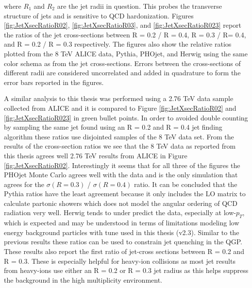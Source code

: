 \noindent
where $R_{1}$ and $R_{2}$ are the jet radii in question. This probes the transverse structure of jets and is sensitive to QCD hardonization\cite{SOYEZ201159}.  Figures \ref{fig:JetXsecRatioR02}, \ref{fig:JetXsecRatioR03}, and \ref{fig:JetXsecRatioR023} report the ratios of the jet cross-sections between R = 0.2 / R = 0.4, R = 0.3 / R= 0.4, and R = 0.2 / R = 0.3 respectively.  The figures also show the relative ratios plotted from the 8 TeV ALICE data, Pythia, PHOjet, and Herwig using the same color schema as from the jet cross-sections.  Errors between the cross-sections of different radii are considered uncorrelated and added in quadrature to form the error bars reported in the figures.

A similar analysis to this thesis was performed using a 2.76 TeV  data sample collected from ALICE\cite{MA2013319} and it is compared to Figure \ref{fig:JetXsecRatioR02} and \ref{fig:JetXsecRatioR023} in green bullet points.  In order to avoided double counting by sampling the same jet  found using an R = 0.2 and R = 0.4 jet finding algorithm these ratios use disjointed samples of the 8 TeV data set.  From the results of the cross-section ratios we see that the 8 TeV data as reported from this thesis agrees well 2.76 TeV results from ALICE in Figure \ref{fig:JetXsecRatioR02}.  Interestingly it seems that for all three of the figures the PHOjet Monte Carlo agrees well with the data and is the only simulation that agrees for the $\sigma (R = 0.3)$ / $\sigma (R = 0.4)$ ratio.  It can be concluded that the Pythia ratios have the least agreement because it only includes the LO matrix to calculate partonic showers which does not model the angular ordering of QCD radiation very well.  Herwig tends to under predict the data, especially at low-$p_{T}$, which is expected and may be understood in terms of limitations modeling low energy background particles with tune used in this thesis (v2.3).  Similar to the previous results these ratios can be used to constrain jet quenching in the QGP.  These results also report the first ratio of jet-cross sections between R = 0.2 and R = 0.3.  These is especially helpful for heavy-ion collisions as most jet results from heavy-ions use either an R = 0.2 or R = 0.3 jet radius as this helps suppress the background in the high multiplicity environment.











